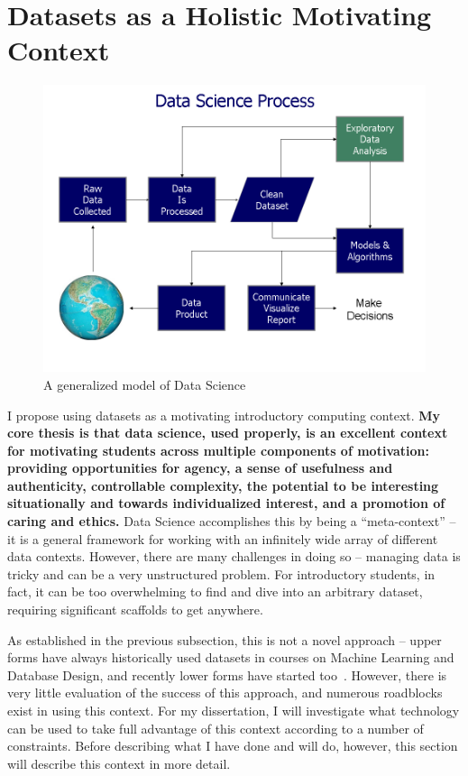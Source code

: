 \section{Datasets as a Holistic Motivating Context}

\begin{figure}
    \begin{center}
    	\includegraphics[width=.5\linewidth]{images/data-science.png}
    \end{center}
    \caption{A generalized model of Data Science\protect\cite{data-science-diagram}}
    \label{fig-data-science}
\end{figure}

I propose using datasets as a motivating introductory computing context.
\textbf{My core thesis is that data science, used properly, is an excellent context for motivating students across multiple components of motivation: providing opportunities for agency, a sense of usefulness and authenticity, controllable complexity, the potential to be interesting situationally and towards individualized interest, and a promotion of caring and ethics.}
Data Science accomplishes this by being a ``meta-context'' -- it is a general framework for working with an infinitely wide array of different data contexts.
However, there are many challenges in doing so -- managing data is tricky and can be a very unstructured problem.
For introductory students, in fact, it can be too overwhelming to find and dive into an arbitrary dataset, requiring significant scaffolds to get anywhere.

As established in the previous subsection, this is not a novel approach -- upper forms have always historically used datasets in courses on Machine Learning and Database Design, and recently lower forms have started too~\cite{Anderson}.
However, there is very little evaluation of the success of this approach, and numerous roadblocks exist in using this context.
For my dissertation, I will investigate what technology can be used to take full advantage of this context according to a number of constraints.
Before describing what I have done and will do, however, this section will describe this context in more detail.

